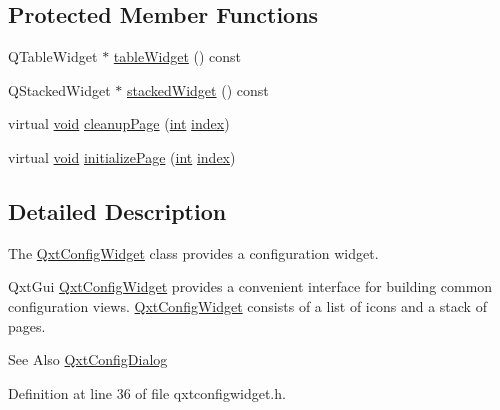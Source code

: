 \subsection*{Protected Member Functions}
\begin{DoxyCompactItemize}
\item 
Q\-Table\-Widget $\ast$ \hyperlink{class_qxt_config_widget_a4eaf6c42576dbb433f2e92af66fb133a}{table\-Widget} () const 
\item 
Q\-Stacked\-Widget $\ast$ \hyperlink{class_qxt_config_widget_ad2f80866462aa684c9d8c2bc6e24430f}{stacked\-Widget} () const 
\item 
virtual \hyperlink{group___u_a_v_objects_plugin_ga444cf2ff3f0ecbe028adce838d373f5c}{void} \hyperlink{class_qxt_config_widget_a8a62b04e0ed7c6e2ab398a2a294a152f}{cleanup\-Page} (\hyperlink{ioapi_8h_a787fa3cf048117ba7123753c1e74fcd6}{int} \hyperlink{glext_8h_ab47dd9958bcadea08866b42bf358e95e}{index})
\item 
virtual \hyperlink{group___u_a_v_objects_plugin_ga444cf2ff3f0ecbe028adce838d373f5c}{void} \hyperlink{class_qxt_config_widget_a354315f166b091a32dfdfcb09243ac1b}{initialize\-Page} (\hyperlink{ioapi_8h_a787fa3cf048117ba7123753c1e74fcd6}{int} \hyperlink{glext_8h_ab47dd9958bcadea08866b42bf358e95e}{index})
\end{DoxyCompactItemize}


\subsection{Detailed Description}
The \hyperlink{class_qxt_config_widget}{Qxt\-Config\-Widget} class provides a configuration widget. 

Qxt\-Gui \hyperlink{class_qxt_config_widget}{Qxt\-Config\-Widget} provides a convenient interface for building common configuration views. \hyperlink{class_qxt_config_widget}{Qxt\-Config\-Widget} consists of a list of icons and a stack of pages.

\begin{DoxySeeAlso}{See Also}
\hyperlink{class_qxt_config_dialog}{Qxt\-Config\-Dialog} 
\end{DoxySeeAlso}


Definition at line 36 of file qxtconfigwidget.\-h.



